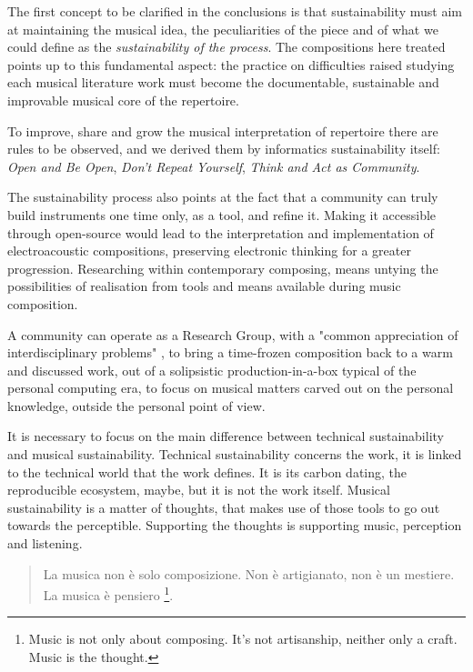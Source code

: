 \documentclass[twoside,a4paper]{article}
\begin{document}
The first concept to be clarified in the conclusions is that sustainability must aim at maintaining the musical idea, the peculiarities of the piece and of what we could define as the \emph{sustainability of the process}. The compositions here treated points up to this fundamental aspect: the practice on difficulties raised studying each musical literature work must become the documentable, sustainable and improvable musical core of the repertoire.

To improve, share and grow the musical interpretation of repertoire there are rules to be observed, and we derived them by informatics sustainability itself: \emph{Open and Be Open}, \emph{Don't Repeat Yourself}, \emph{Think and Act as Community}.

The sustainability process also points at the fact that a community can truly build instruments one time only, as a tool, and refine it. Making it accessible through open-source would lead to the interpretation and implementation of electroacoustic compositions, preserving electronic thinking for a greater progression. Researching within contemporary composing, means untying the possibilities of realisation from tools and means available during music composition.

A community can operate as a Research Group, with a "common appreciation of interdisciplinary problems" \cite{ml91}, to bring a time-frozen composition back to a warm and discussed work, out of a solipsistic production-in-a-box typical of the personal computing era, to focus on musical matters carved out on the personal knowledge, outside the personal point of view. 

It is necessary to focus on the main difference between technical sustainability and musical sustainability. Technical sustainability concerns the work, it is linked to the technical world that the work defines. It is its carbon dating, the reproducible ecosystem, maybe, but it is not the work itself. Musical sustainability is a matter of thoughts, that makes use of those tools to go out towards the perceptible. Supporting the thoughts is supporting music, perception and listening.

\begin{quote}
La musica non è solo composizione. Non è artigianato, non è un mestiere. La musica è pensiero \cite{nono85}\footnote{Music is not only about composing. It’s not artisanship, neither only a craft. Music is the thought.}.
\end{quote}
%
\end{document}
